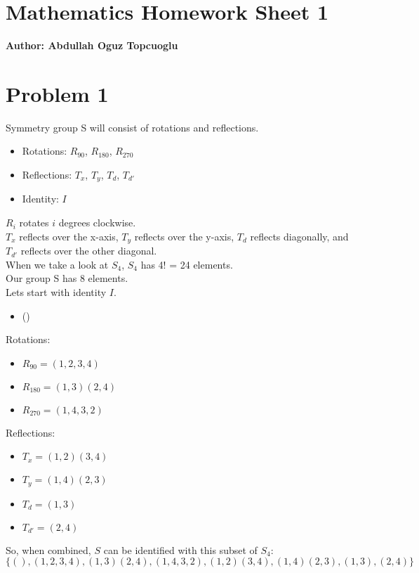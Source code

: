 \documentclass{article}
\begin{document}
\section*{\huge Mathematics Homework Sheet 1}
\begin{flushright}
   \textbf{Author: Abdullah Oguz Topcuoglu}
\end{flushright}

\section*{Problem 1}
Symmetry group S will consist of rotations and reflections.
\begin{itemize}
    \item Rotations: $R_{90}$, $R_{180}$, $R_{270}$
    \item Reflections: $T_x$, $T_y$, $T_d$, $T_{d'}$
    \item Identity: $I$
\end{itemize}

\begin{center}
\end{center}

$R_{i}$ rotates $i$ degrees clockwise. \\
$T_x$ reflects over the x-axis, $T_y$ reflects over the y-axis, $T_d$ reflects diagonally, and $T_{d'}$ reflects over the other diagonal.
\\
When we take a look at $S_4$, $S_4$ has 4! = 24 elements. \\
Our group S has 8 elements. \\
Lets start with identity $I$.
\begin{itemize}
   \item ()
\end{itemize}
Rotations:
\begin{itemize}
   \item $R_{90} = (1, 2, 3, 4)$
   \item $R_{180} = (1,3)(2,4)$
   \item $R_{270} = (1,4,3,2)$
\end{itemize}
Reflections:
\begin{itemize}
   \item $T_x = (1,2)(3,4)$
   \item $T_y = (1,4)(2,3)$
   \item $T_d = (1,3)$
   \item $T_{d'} = (2,4)$
\end{itemize}

So, when combined, \(S\) can be identified with this subset of \(S_4\):
\[
   \{ (), (1, 2, 3, 4), (1,3)(2,4), (1,4,3,2), (1,2)(3,4), (1,4)(2,3), (1,3), (2,4) \}
\]
\end{document}
